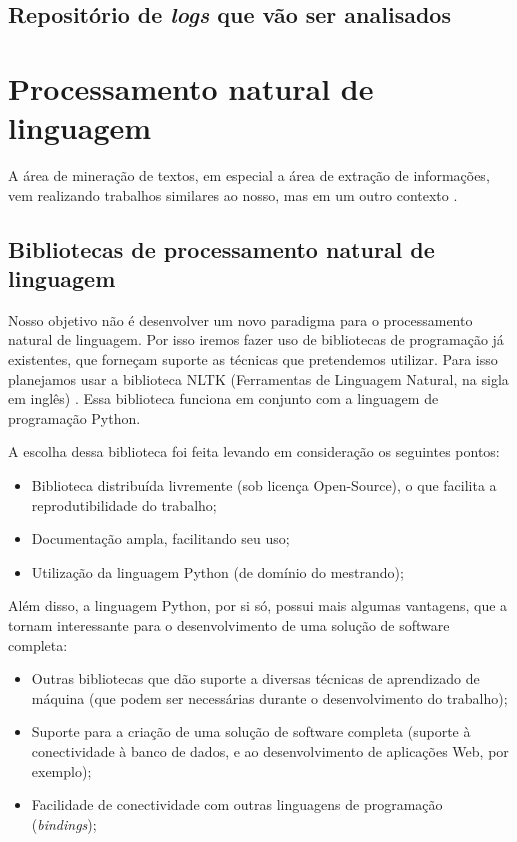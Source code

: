 \documentclass[
	12pt,				%
	openright,			%
	twoside,			%
	a4paper,			%
	english,			%
	french,				%
	spanish,			%
	brazil,				%
	]{abntex2}
\begin{document}
\subsection{Repositório de \emph{logs} que vão ser analisados}

\section{Processamento natural de linguagem}

A área de mineração de textos, em especial a área de extração de informações, vem realizando trabalhos similares ao nosso, mas em um outro contexto \cite{duque2012processo, matos2010environment}.

\subsection{Bibliotecas de processamento natural de linguagem}

Nosso objetivo não é desenvolver um novo paradigma para o processamento natural de linguagem. Por isso iremos fazer uso de bibliotecas de programação já existentes, que forneçam suporte as técnicas que pretendemos utilizar. Para isso planejamos usar a biblioteca NLTK (Ferramentas de Linguagem Natural, na sigla em inglês) \cite{bird2009natural}. Essa biblioteca funciona em conjunto com a linguagem de programação Python.

A escolha dessa biblioteca foi feita levando em consideração os seguintes pontos:

\begin{itemize}
	\item Biblioteca distribuída livremente (sob licença Open-Source), o que facilita a reprodutibilidade do trabalho;
	\item Documentação ampla, facilitando seu uso;
	\item Utilização da linguagem Python (de domínio do mestrando);
\end{itemize}

Além disso, a linguagem Python, por si só, possui mais algumas vantagens, que a tornam interessante para o desenvolvimento de uma solução de software completa:
\begin{itemize}
	\item Outras bibliotecas que dão suporte a diversas técnicas de aprendizado de máquina (que podem ser necessárias durante o desenvolvimento do trabalho);
	\item Suporte para a criação de uma solução de software completa (suporte à conectividade à banco de dados, e ao desenvolvimento de aplicações Web, por exemplo);
	\item Facilidade de conectividade com outras linguagens de programação (\emph{bindings});
\end{itemize}
\end{document}
